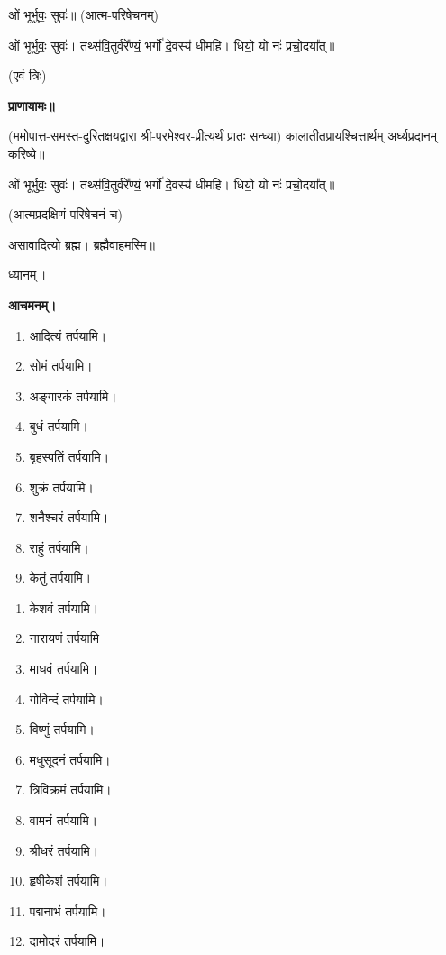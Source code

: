 ओं भूर्भुवः॒ सुवः॑॥ (आत्म-परिषेचनम्)



ओं भूर्भुवः॒ सुवः॑। तथ्स॑वि॒तुर्वरे᳚ण्यं॒ भर्गो॑ दे॒वस्य॑ धीमहि। धियो॒ यो नः॑ प्रचो॒दया᳚त्॥

\hfill{(एवं त्रिः)}


\textbf{प्राणायामः॥}

(ममोपात्त-समस्त-दुरितक्षयद्वारा श्री-परमेश्वर-प्रीत्यर्थं प्रातः सन्ध्या)
कालातीतप्रायश्चित्तार्थम् अर्घ्यप्रदानम् करिष्ये॥

ओं भूर्भुवः॒ सुवः॑। तथ्स॑वि॒तुर्वरे᳚ण्यं॒ भर्गो॑ दे॒वस्य॑ धीमहि। धियो॒ यो नः॑ प्रचो॒दया᳚त्॥

(आत्मप्रदक्षिणं परिषेचनं च)


असावादित्यो ब्रह्म। ब्रह्मैवाहमस्मि॥

ध्यानम्॥

\textbf{आचमनम्।}



\begin{enumerate}
 \item आदित्यं तर्पयामि।
 \item सोमं तर्पयामि।
 \item अङ्गारकं तर्पयामि।
 \item बुधं तर्पयामि।
 \item बृहस्पतिं तर्पयामि।
 \item शुक्रं तर्पयामि।
 \item शनैश्चरं तर्पयामि।
 \item राहुं तर्पयामि।
 \item केतुं तर्पयामि।
\end{enumerate}


\begin{enumerate}
\item केशवं तर्पयामि।
\item नारायणं तर्पयामि।
\item माधवं तर्पयामि।
\item गोविन्दं तर्पयामि।
\item विष्णुं तर्पयामि।
\item मधुसूदनं तर्पयामि।
\item त्रिविक्रमं तर्पयामि।
\item वामनं तर्पयामि।
\item श्रीधरं तर्पयामि।
\item हृषीकेशं तर्पयामि।
\item पद्मनाभं तर्पयामि।
\item दामोदरं तर्पयामि।
\end{enumerate}

